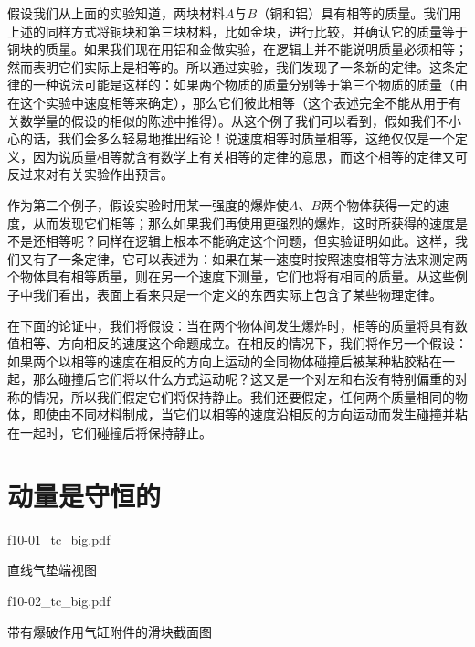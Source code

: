 \documentclass[12pt,oneside]{book}
\begin{document}
假设我们从上面的实验知道，两块材料$A$与$B$（铜和铝）具有相等的质量。我们用上述的同样方式将铜块和第三块材料，比如金块，进行比较，并确认它的质量等于铜块的质量。如果我们现在用铝和金做实验，在逻辑上并不能说明质量必须相等；然而表明它们实际上是相等的。所以通过实验，我们发现了一条新的定律。这条定律的一种说法可能是这样的：如果两个物质的质量分别等于第三个物质的质量（由在这个实验中速度相等来确定），那么它们彼此相等（这个表述完全不能从用于有关数学量的假设的相似的陈述中推得）。从这个例子我们可以看到，假如我们不小心的话，我们会多么轻易地推出结论！说速度相等时质量相等，这绝仅仅是一个定义，因为说质量相等就含有数学上有关相等的定律的意思，而这个相等的定律又可反过来对有关实验作出预言。

作为第二个例子，假设实验时用某一强度的爆炸使$A$、$B$两个物体获得一定的速度，从而发现它们相等；那么如果我们再使用更强烈的爆炸，这时所获得的速度是不是还相等呢？同样在逻辑上根本不能确定这个问题，但实验证明如此。这样，我们又有了一条定律，它可以表述为：如果在某一速度时按照速度相等方法来测定两个物体具有相等质量，则在另一个速度下测量，它们也将有相同的质量。从这些例子中我们看出，表面上看来只是一个定义的东西实际上包含了某些物理定律。

在下面的论证中，我们将假设：当在两个物体间发生爆炸时，相等的质量将具有数值相等、方向相反的速度这个命题成立。在相反的情况下，我们将作另一个假设：如果两个以相等的速度在相反的方向上运动的全同物体碰撞后被某种粘胶粘在一起，那么碰撞后它们将以什么方式运动呢？这又是一个对左和右没有特别偏重的对称的情况，所以我们假定它们将保持静止。我们还要假定，任何两个质量相同的物体，即使由不同材料制成，当它们以相等的速度沿相反的方向运动而发生碰撞并粘在一起时，它们碰撞后将保持静止。


\section{动量是守恒的}
\begin{fig}{f10-01_tc_big.pdf}
\caption{直线气垫端视图}
\label{fig:直线气垫端视图}
\end{fig}

\begin{fig}{f10-02_tc_big.pdf}
\caption{带有爆破作用气缸附件的滑块截面图}
\label{fig:带有爆破作用气缸附件的滑块截面图}
\end{fig}
\end{document}
